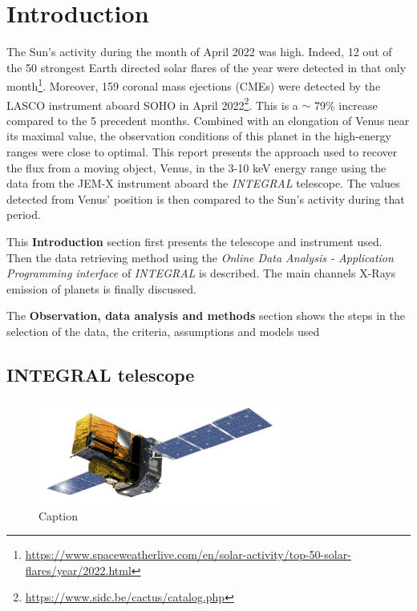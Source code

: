 \section{Introduction}
The Sun's activity during the month of April 2022 was high. Indeed, 12 out of the 50 strongest Earth directed solar flares of the year were detected in that only month\footnote{\url{https://www.spaceweatherlive.com/en/solar-activity/top-50-solar-flares/year/2022.html}}. Moreover, 159 coronal mass ejections (CMEs) were detected by the LASCO instrument aboard SOHO in April 2022\footnote{\url{https://www.sidc.be/cactus/catalog.php}}. This is a $\sim$ 79\% increase compared to the 5 precedent months. Combined with an elongation of Venus near its maximal value, the observation conditions of this planet in the high-energy ranges were close to optimal. This report presents the approach used to recover the flux from a moving object, Venus, in the 3-10 keV energy range using the data from the JEM-X instrument aboard the \textit{INTEGRAL} telescope. The values detected from Venus' position is then compared to the Sun's activity during that period.

This \textbf{Introduction }section first presents the telescope and instrument used. Then the data retrieving method using the \textit{Online Data Analysis - Application Programming interface} of \textit{INTEGRAL} is described. The main channels X-Rays emission of planets is finally discussed.

The \textbf{Observation, data analysis and methods} section shows the steps in the selection of the data, the criteria, assumptions and models used
\subsection{INTEGRAL telescope}
    
    \begin{figure}[H]
        \centering
        \includegraphics[width = 8cm]{report/Figures/intro/INTEGRAL_spacecraft_model.png}
        \caption{Caption}
        \label{integral}
    \end{figure}
    
